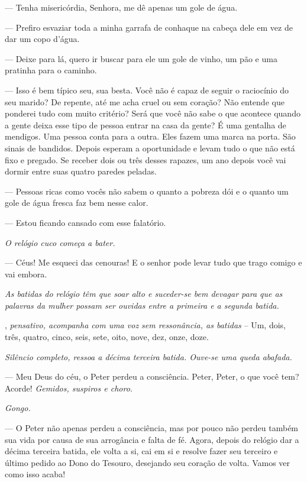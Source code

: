 \begin{myparindent}{0pt}
\begin{Parskip}
 --- Tenha misericórdia, Senhora, me dê apenas um gole de água.

 --- Prefiro esvaziar toda a minha garrafa de conhaque na cabeça
dele em vez de dar um copo d'água.

 --- Deixe para lá, quero ir buscar para ele um gole de vinho, um
pão e uma pratinha para o caminho.

 --- Isso é bem típico seu, sua besta. Você não é capaz de seguir o
raciocínio do seu marido? De repente, até me acha cruel ou sem coração?
Não entende que ponderei tudo com muito critério? Será que você não sabe
o que acontece quando a gente deixa esse tipo de pessoa entrar na casa
da gente? É uma gentalha de mendigos. Uma pessoa conta para a outra.
Eles fazem uma marca na porta. São sinais de bandidos. Depois esperam a
oportunidade e levam tudo o que não está fixo e pregado. Se receber dois
ou três desses rapazes, um ano depois você vai dormir entre suas quatro
paredes peladas.

 --- Pessoas ricas como vocês não sabem o quanto a pobreza dói e o
quanto um gole de água fresca faz bem nesse calor.

 --- Estou ficando cansado com esse falatório.

\emph{O relógio cuco começa a bater.}

 --- Céus! Me esqueci das cenouras! E o senhor pode levar tudo que
trago comigo e vai embora.

\emph{As batidas do relógio têm que soar alto e suceder-se bem devagar
para que as palavras da mulher possam ser ouvidas entre a primeira e a
segunda batida.}

, \emph{pensativo, acompanha com uma voz sem ressonância, as
batidas} -- Um, dois, três, quatro, cinco, seis, sete, oito, nove, dez,
onze, doze.

\emph{Silêncio completo, ressoa a décima terceira batida. Ouve-se uma
queda abafada.}

 --- Meu Deus do céu, o Peter perdeu a consciência. Peter, Peter,
o que você tem? Acorde! \emph{Gemidos, suspiros e choro.}

\emph{Gongo.}

 --- O Peter não apenas perdeu a consciência, mas por pouco não
perdeu também sua vida por causa de sua arrogância e falta de fé. Agora,
depois do relógio dar a décima terceira batida, ele volta a si, cai em
si e resolve fazer seu terceiro e último pedido ao Dono do Tesouro,
desejando seu coração de volta. Vamos ver como isso acaba!


\end{Parskip}
\end{myparindent}
